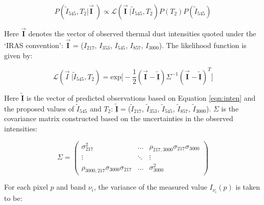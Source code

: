 \documentclass{emulateapj}
\begin{document}
\begin{equation}
\label{eqn:post}
P(\tilde{I}_{545}, T_2|\vec{\mathbf{I}}~) \propto \mathcal{L}(\vec{\mathbf{I}}~|\tilde{I}_{545}, T_2)P(T_2)P(\tilde{I}_{545})
\end{equation}


Here $\vec{\mathbf{I}}$ denotes the vector of observed thermal dust intensities quoted 
under the `IRAS convention': $\vec{\mathbf{I}}$ = ($I_{217}$, $I_{353}$, $I_{545}$, 
$I_{857}$, $I_{3000}$). The likelihood function is given by:


\begin{equation} \label{equ:like}
\mathcal{L}(\vec{I}~|\tilde{I}_{545}, T_2) = \textrm{exp}\Big[-\frac{1}{2}(\vec{\mathbf{I}}-\underline{\mathbf{\tilde{I}}})\Sigma^{-1}(\vec{\mathbf{I}}-\underline{\mathbf{\tilde{I}}})^T\Big]
\end{equation}


Here $\underline{\mathbf{\tilde{I}}}$ is the vector of predicted observations 
based on Equation \ref{eqn:inten} and the proposed values of $\tilde{I}_{545}$ 
and $T_2$: $\underline{\mathbf{\tilde{I}}} = $($\tilde{I}_{217}$, 
$\tilde{I}_{353}$, $\tilde{I}_{545}$, $\tilde{I}_{857}$, $\tilde{I}_{3000}$). 
$\Sigma$ is the covariance matrix constructed based on the uncertainties in the
observed intensities:

\begin{equation}
\Sigma = \begin{pmatrix} \sigma^2_{217}                           & \ldots  & \rho_{217,3000}\sigma_{217}\sigma_{3000} \\ 
                         \vdots                                   & \ddots  & \vdots                                   \\
                         \rho_{3000,217}\sigma_{3000}\sigma_{217} & \ldots  & \sigma^2_{3000}
\end{pmatrix}
\end{equation}

For each pixel $p$ and band $\nu_i$, the variance of the measured value 
$I_{\nu_i}(p)$ is taken to be:
\end{document}
